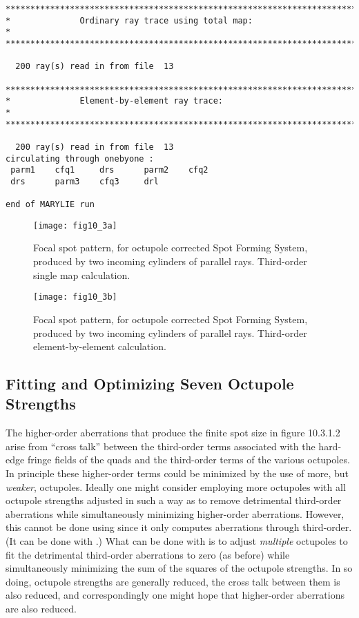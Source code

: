 \begin{footnotesize}
\begin{verbatim}
**************************************************************************
*              Ordinary ray trace using total map:                       *
**************************************************************************

  200 ray(s) read in from file  13

**************************************************************************
*              Element-by-element ray trace:                             *
**************************************************************************

  200 ray(s) read in from file  13
circulating through onebyone :
 parm1    cfq1     drs      parm2    cfq2
 drs      parm3    cfq3     drl

end of MARYLIE run
\end{verbatim}
\end{footnotesize}

\newpage
\setcounter{figure}{0}
\begin{figure}[h]
  \centering
  \texttt{[image: fig10\_3a]}
  \caption{Focal spot pattern, for octupole corrected Spot Forming System,
produced by two incoming cylinders of parallel rays.  Third-order single
map calculation.}
\end{figure}

\newpage
\begin{figure}[h]
  \centering
  \texttt{[image: fig10\_3b]}
  \caption{Focal spot pattern, for octupole corrected Spot Forming System,
produced by two incoming cylinders of parallel rays.  Third-order
element-by-element calculation.}
\end{figure}

\newpage
\subsection{Fitting and Optimizing Seven Octupole Strengths}
\label{seven}
The higher-order aberrations that produce the finite spot size in figure
10.3.1.2 arise from ``cross talk'' between the third-order terms associated
with the hard-edge fringe fields of the quads and the third-order terms
of the various octupoles.  In principle these higher-order terms could be
minimized by the use of more, but {\em weaker}, octupoles.  Ideally one
might consider employing more octupoles with all octupole strengths
adjusted in such a way as to remove detrimental third-order aberrations
while simultaneously minimizing higher-order aberrations.  However,
this cannot be done using  since it only computes aberrations
through third-order.  (It can be done with .)  What can be done
with  is to adjust {\em multiple} octupoles to fit the
detrimental third-order aberrations to zero (as before) while
simultaneously minimizing the sum of the squares of the octupole
strengths.  In so doing, octupole strengths are generally reduced, the
cross talk between them is also reduced, and correspondingly one
might hope that higher-order aberrations are also reduced.   

